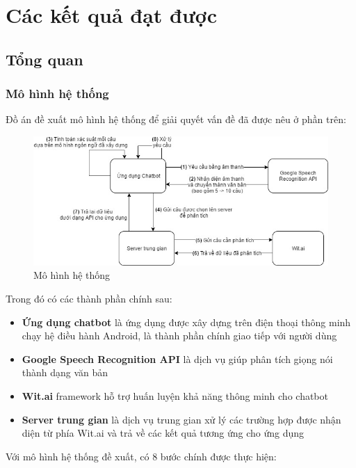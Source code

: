 \documentclass[12pt]{report}
\begin{document}
\stopcontents[parts]

\part{Các kết quả đạt được}
\startcontents[parts]
\chapter{Tổng quan}
\section{Mô hình hệ thống}
Đồ án đề xuất mô hình hệ thống để giải quyết vấn đề đã được nêu ở phần trên:

\begin{figure}[H]
	\centering
		\includegraphics[width=15cm]{Pics/Chap2/VVC.jpg}
	\caption{Mô hình hệ thống}
\end{figure}

\noindent Trong đó có các thành phần chính sau:

\begin{itemize}
	\item \textbf{Ứng dụng chatbot} là ứng dụng được xây dựng trên điện thoại thông minh chạy hệ điều hành Android, là thành phần chính giao tiếp với người dùng
	\item \textbf{Google Speech Recognition API} là dịch vụ giúp phân tích giọng nói thành dạng văn bản
	\item \textbf{Wit.ai} framework hỗ trợ huấn luyện khả năng thông minh cho chatbot
	\item \textbf{Server trung gian} là dịch vụ trung gian xử lý các trường hợp được nhận diện từ phía Wit.ai và trả về các kết quả tương ứng cho ứng dụng
\end{itemize}

\noindent Với mô hình hệ thống đề xuất, có 8 bước chính được thực hiện:
\end{document}
